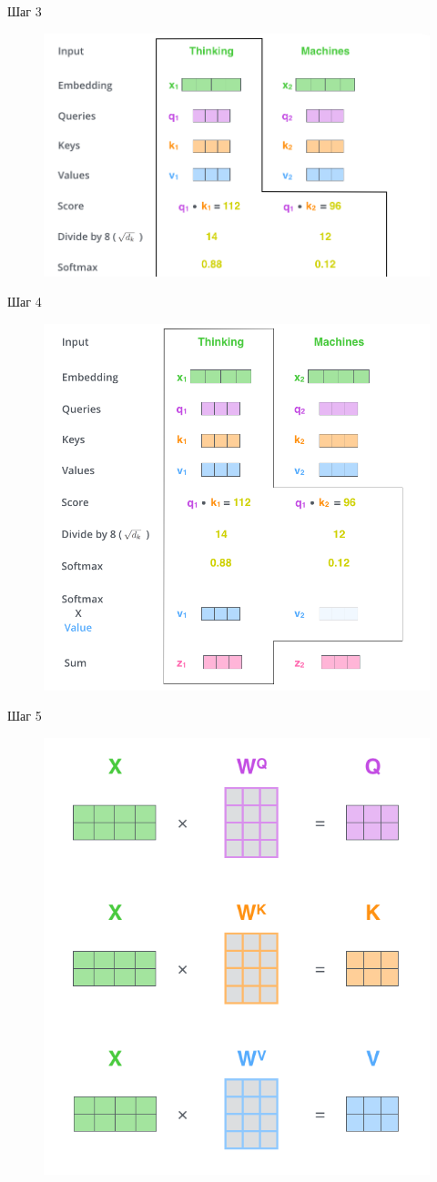 \documentclass[notes,12pt, aspectratio=169]{beamer}
\begin{document}
\begin{frame}{Шаг 3}
\begin{figure}
	\centering
	\includegraphics[width=0.8\linewidth]{images/step_3}
	\label{fig:seq2seq}
\end{figure}
\end{frame}

\begin{frame}{Шаг 4}
\begin{figure}
	\centering
	\includegraphics[width=0.5\linewidth]{images/step_4}
	\label{fig:seq2seq}
\end{figure}
\end{frame}

\begin{frame}{Шаг 5}
\begin{figure}
	\centering
	\includegraphics[width=0.4\linewidth]{images/step_5}
	\label{fig:seq2seq}
\end{figure}
\end{frame}
\end{document}
